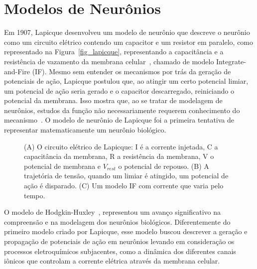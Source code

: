 \section{Modelos de Neurônios}\label{section_modelos_neuronios} 

Em 1907, Lapicque desenvolveu um modelo de neurônio que descreve o neurônio como um circuito elétrico contendo um capacitor e um
resistor em paralelo, como representado na Figura~\ref{fig_lapicque}, representando a capacitância e a resistência de vazamento da
membrana celular~\cite{lapicqueRecherches1907}, chamado de modelo Integrate-and-Fire (IF). Mesmo sem entender os mecanismos por
trás da geração de potenciais de ação, Lapicque postulou que, ao atingir um certo potencial limiar, um potencial de ação seria
gerado e o capacitor descarregado, reiniciando o potencial da membrana. Isso mostra que, ao se tratar de modelagem de neurônios,
estudos da função não necessariamente requerem conhecimento do mecanismo~\cite{abbottLapicque1999}. O modelo de neurônio de
Lapicque foi a primeira tentativa de representar matematicamente um neurônio biológico.

\begin{figure}[!ht]
\caption{(A) O circuito elétrico de Lapicque: I é a corrente injetada, C a capacitância da membrana, R a resistência da membrana,
V o potencial de membrana e $V_{rest}$ o potencial de repouso. (B) A trajetória de tensão, quando um limiar é atingido, um
potencial de ação é disparado. (C) Um modelo IF com corrente que varia pelo tempo.}
\end{figure}

O modelo de Hodgkin-Huxley~\cite{hodgkinQuantitative1952}, representou um avanço significativo na compreensão e na modelagem dos
neurônios biológicos. Diferentemente do primeiro modelo criado por Lapicque, esse modelo buscou descrever a geração e propagação
de potenciais de ação em neurônios levando em consideração os processos eletroquímicos subjacentes, como a dinâmica dos diferentes
canais iônicos que controlam a corrente elétrica através da membrana celular.

